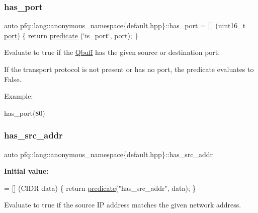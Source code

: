 \subsubsection{\texorpdfstring{has\+\_\+port}{has\_port}}
{\footnotesize\ttfamily auto pfq\+::lang\+::anonymous\+\_\+namespace\{default.\+hpp\}\+::has\+\_\+port = \mbox{[}$\,$\mbox{]} (uint16\+\_\+t \hyperlink{namespacepfq_1_1lang_1_1anonymous__namespace_02default_8hpp_03_a868eca03290a037cb4e9b7075085888b}{port}) \{ return \hyperlink{namespacepfq_1_1lang_aca9adafc436b7f851621b979fa1aaf88}{predicate} (\char`\"{}is\+\_\+port\char`\"{}, port); \}}



Evaluate to {\ttfamily true} if the \hyperlink{structpfq_1_1lang_1_1Qbuff}{Qbuff} has the given source or destination port. 

If the transport protocol is not present or has no port, the predicate evaluates to False.

Example\+:

has\+\_\+port(80) \mbox{\label{namespacepfq_1_1lang_1_1anonymous__namespace_02default_8hpp_03_acb03dd3e34d6dd7e83d621fa9077194c}} 
\subsubsection{\texorpdfstring{has\+\_\+src\+\_\+addr}{has\_src\_addr}}
{\footnotesize\ttfamily auto pfq\+::lang\+::anonymous\+\_\+namespace\{default.\+hpp\}\+::has\+\_\+src\+\_\+addr}

{\bfseries Initial value\+:}
\begin{DoxyCode}
= [] (CIDR data)
        \{
            \textcolor{keywordflow}{return} \hyperlink{namespacepfq_1_1lang_aca9adafc436b7f851621b979fa1aaf88}{predicate}(\textcolor{stringliteral}{"has\_src\_addr"}, data);
        \}
\end{DoxyCode}


Evaluate to {\ttfamily true} if the source IP address matches the given network address. 

\mbox{\label{namespacepfq_1_1lang_1_1anonymous__namespace_02default_8hpp_03_a964d5ed41f50a1f3a04176f8e54d7a5a}} 
